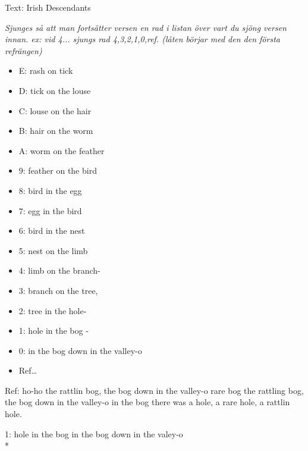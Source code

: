 \begin{SongText}
    \begin{SongInfo}
        Text: Irish Descendants
    \end{SongInfo}
    \begin{SongVerse}
        \emph{Sjunges så att man fortsätter versen en rad i listan över vart
            du sjöng versen innan. ex: vid 4... sjungs rad 4,3,2,1,0,ref.
            (låten börjar med den den första refrängen)}
        \begin{itemize}
            \item E: rash on tick
            \item D: tick on the louse
            \item C: louse on the hair
            \item B: hair on the worm
            \item A: worm on the feather
            \item 9: feather on the bird
            \item 8: bird in the egg
            \item 7: egg in the bird
            \item 6: bird in the nest
            \item 5: nest on the limb
            \item 4: limb on the branch-
            \item 3: branch on the tree,
            \item 2: tree in the hole-
            \item 1: hole in the bog -
            \item 0: in the bog down in the valley-o
            \item Ref…
        \end{itemize}
        Ref:
        ho-ho the rattlin bog, the bog down in the valley-o
        rare bog the rattling bog, the bog down in the valley-o
        in the bog there was a hole, a rare hole, a rattlin hole.
    \end{SongVerse}
    \begin{SongVerse}
        1:
        hole in the bog in the bog down in the valey-o\\*%

\end{SongVerse}
\end{SongText}
